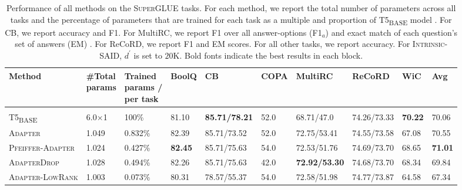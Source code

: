 \documentclass{article}
\newcommand{\basebase}{T5\textsubscript{\tiny BASE}\xspace}
\newcommand{\adapter}{\textsc{Adapter}\xspace}
\newcommand{\adapterlowrank}{\textsc{Adapter-LowRank}\xspace}
\newcommand{\intrinsic}{\textsc{Intrinsic-SAID}\xspace}
\newcommand{\pfeifferadapter}{\textsc{Pfeiffer-Adapter}\xspace}
\newcommand{\superglue}{\textsc{SuperGLUE}\xspace}
\newcommand{\adapterdrop}{\textsc{AdapterDrop}\xspace}
\begin{document}
\begin{table}[tp] %
\centering 
\caption{Performance of all methods on the \superglue tasks. For each method, we report the total number of parameters across all tasks and the percentage of parameters that are trained for each task as a multiple and proportion of \basebase model \citep{raffel2019exploring}. For CB, we report accuracy and F1. For MultiRC, we report  F1 over all answer-options (F1$_a$) and exact match of each question's set of answers (EM) \cite{wang2019superglue}. For ReCoRD, we report F1 and EM scores. For all other tasks, we report accuracy. For \intrinsic, $d^{\prime}$ is set to $20$K.  Bold fonts indicate the best results in each block.} 
\begin{adjustbox}{max width=\textwidth}
\begin{tabular}{l@{\hskip 0.02in}|l@{\hskip 0.06in}l@{\hskip 0.0in}|l@{\hskip 0.08in}l@{\hskip 0.08in}l@{\hskip 0.08in}l@{\hskip 0.08in}l@{\hskip 0.08in}l@{\hskip 0.08in}|l}
\toprule %
\textbf{Method} & \pbox{3cm}{\textbf{\#Total}\\ \textbf{params}} & \pbox{3cm}{\textbf{Trained} \\ \textbf{params /}\\ \textbf{per task\vspace{0.1em}}} & \textbf{BoolQ} &    \textbf{CB} &   \textbf{COPA} &   \textbf{MultiRC} &     \textbf{ReCoRD} & \textbf{WiC}  & \textbf{Avg} \\
\toprule 
\rowcolor{gray!20}\multicolumn{10}{c}{\it \textbf{Baselines}}\\
\midrule 
\basebase &  6.0$\times$1 &   100\%  &   81.10 &  \textbf{85.71/78.21} &            52.0 &        68.71/47.0 &      74.26/73.33 &          \textbf{70.22} &  70.06 \\
\adapter& 1.049& 0.832\% & 82.39 &  85.71/73.52 &            52.0 &       72.75/53.41 &      74.55/73.58 &          67.08 &  70.55\\
\pfeifferadapter &1.024&0.427\%& \textbf{82.45} &  85.71/75.63 &            54.0 &       72.53/51.76 &       74.69/73.70 &          68.65 &  \textbf{71.01}\\
\adapterdrop & 1.028&0.494\% &  82.26 &  85.71/75.63 &            42.0 &        \textbf{72.92/53.30} &       74.68/73.70 &          68.34 &  69.84\\ 
\adapterlowrank &  1.003 & 0.073\% & 80.31 &  78.57/55.37 &            54.0 &       72.58/51.98 &      74.77/73.87 &          64.58 &  67.34 \\
\midrule 

\end{tabular}
\end{adjustbox}
\end{table}
\end{document}
